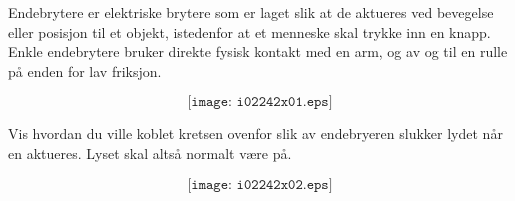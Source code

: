 

Endebrytere er elektriske brytere som er laget slik at de aktueres ved bevegelse eller posisjon til et objekt, istedenfor at et menneske skal trykke inn en knapp. Enkle endebrytere bruker direkte fysisk kontakt med en arm, og av og til en rulle på enden for lav friksjon. 

$$\texttt{[image: i02242x01.eps]}$$

\vskip 30pt

Vis hvordan du ville koblet kretsen ovenfor slik av endebryeren slukker lydet når en aktueres. Lyset skal altså normalt være på. 







$$\texttt{[image: i02242x02.eps]}$$












